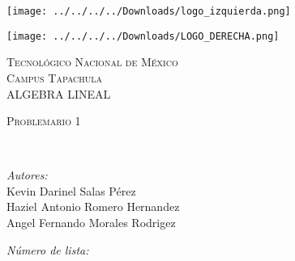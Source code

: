 \documentclass[12pt,a4paper]{report}
\begin{document}
\begin{center}
\newcommand{\HRule}{\rule{\linewidth}{0.5mm}}
\begin{minipage}{0.48\textwidth} \begin{flushleft}
\texttt{[image: ../../../../Downloads/logo\_izquierda.png]} 
\end{flushleft}\end{minipage}
\begin{minipage}{0.48\textwidth} \begin{flushright}
\texttt{[image: ../../../../Downloads/LOGO\_DERECHA.png]} 
\end{flushright}\end{minipage}
\vspace*{1.0cm}	

\textsc{\huge Tecnológico Nacional de México\\ \vspace{5px} Campus Tapachula}\\[1.5cm]	

\textsc{\LARGE ALGEBRA LINEAL \\}
\vspace{2cm}										

\begin{minipage}{0.9\textwidth} 
\begin{center}	
\textsc{\LARGE Problemario 1 }
\end{center}
\end{minipage}\\[0.5cm]
 			\vspace*{1cm}																		%

\begin{minipage}{0.46\textwidth}													%
\begin{flushleft} \large															%

\emph{Autores:}\\	
Kevin Darinel Salas Pérez\\
Haziel Antonio Romero Hernandez\\
Angel Fernando Morales Rodrigez\\
\end{flushleft}																		%
\end{minipage}		
\begin{minipage}{0.52\textwidth}		
\vspace{-0.6cm}											%
\begin{flushright} \large															%
\emph{Número de lista:} \\																	%
\end{flushright}																	%
\end{minipage}	
\vspace*{1cm}
 	

\end{center}
\end{document}
